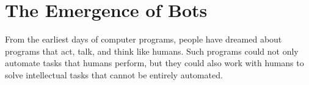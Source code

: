 \documentclass{sig-alternate}
\begin{document}
%
\author{
% 
%
\alignauthor
XXX\\
       \\
}

\date{29 Sept 2017}

\maketitle
%




\section{The Emergence of Bots} 


From the earliest days of computer programs, people have dreamed about programs that act, talk, and think like humans.
Such programs could not only automate tasks that humans perform, but they could also work with humans to solve intellectual tasks that cannot be entirely automated.
\end{document}
